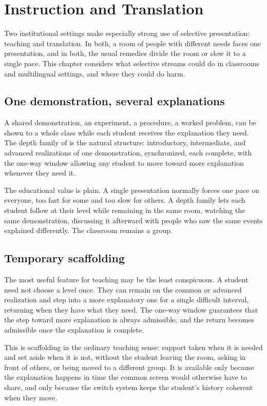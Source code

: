 \chapter{Instruction and Translation}\label{ch:instruction}

Two institutional settings make especially strong use of selective presentation: teaching and translation. In both, a room of people with different needs faces one presentation, and in both, the usual remedies divide the room or slow it to a single pace. This chapter considers what selective streams could do in classrooms and multilingual settings, and where they could do harm.

\section{One demonstration, several explanations}

A shared demonstration, an experiment, a procedure, a worked problem, can be shown to a whole class while each student receives the explanation they need. The depth family of  is the natural structure: introductory, intermediate, and advanced realizations of one demonstration, synchronized, each complete, with the one-way window allowing any student to move toward more explanation whenever they need it.

The educational value is plain. A single presentation normally forces one pace on everyone, too fast for some and too slow for others. A depth family lets each student follow at their level while remaining in the same room, watching the same demonstration, discussing it afterward with people who saw the same events explained differently. The classroom remains a group.

\section{Temporary scaffolding}

The most useful feature for teaching may be the least conspicuous. A student need not choose a level once. They can remain on the common or advanced realization and step into a more explanatory one for a single difficult interval, returning when they have what they need. The one-way window guarantees that the step toward more explanation is always admissible, and the return becomes admissible once the explanation is complete.

This is scaffolding in the ordinary teaching sense: support taken when it is needed and set aside when it is not, without the student leaving the room, asking in front of others, or being moved to a different group. It is available only because the explanation happens in time the common screen would otherwise have to share, and only because the switch system keeps the student's history coherent when they move.

